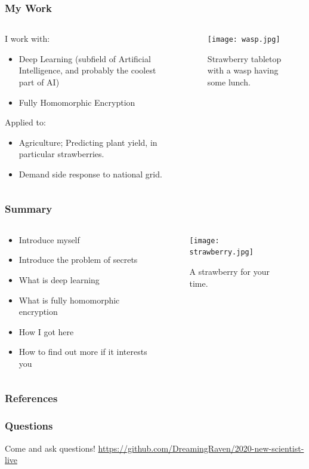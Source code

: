 \documentclass[aspectratio=169]{beamer}
\begin{document}
  \begin{frame}
    \frametitle{My Work}
    \begin{columns}
      \begin{column}{0.5\textwidth}
        I work with:
        \begin{itemize}
          \item Deep Learning (subfield of Artificial Intelligence, and probably the coolest part of AI)
          \item Fully Homomorphic Encryption
        \end{itemize}
        Applied to:
        \begin{itemize}
          \item Agriculture; Predicting plant yield, in particular strawberries.
          \item Demand side response to national grid.
        \end{itemize}
      \end{column}
      \begin{column}{0.5\textwidth}
        \begin{figure}[th!]
          \centering
          \texttt{[image: wasp.jpg]}
          \caption{Strawberry tabletop with a wasp having some lunch.}
          \label{fig:wasp}
        \end{figure}
      \end{column}

    \end{columns}
  \end{frame}

  \begin{frame}
    \frametitle{Summary}
    \begin{columns}
      \begin{column}{0.5\textwidth}
        \begin{itemize}
          \item Introduce myself
          \item Introduce the problem of secrets
          \item What is deep learning
          \item What is fully homomorphic encryption
          \item How I got here
          \item How to find out more if it interests you
        \end{itemize}
      \end{column}
      \begin{column}{0.5\textwidth}
        \begin{figure}[th!]
          \centering
          \texttt{[image: strawberry.jpg]}
          \caption{A strawberry for your time.}
          \label{fig:strawberry}
        \end{figure}
      \end{column}
    \end{columns}
  \end{frame}

  \begin{frame}[allowframebreaks]
    \frametitle{References}
    \printbibliography
  \end{frame}

  \begin{frame}
      \frametitle{Questions}
      Come and ask questions!
      \url{https://github.com/DreamingRaven/2020-new-scientist-live}
  \end{frame}
\end{document}
